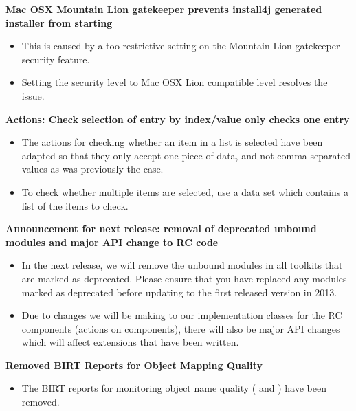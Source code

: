 
\textbf{Mac OSX Mountain Lion gatekeeper prevents install4j generated installer from starting}
\begin{itemize}
\item This is caused by a too-restrictive setting on the Mountain Lion gatekeeper security feature.
\item Setting the security level to Mac OSX Lion compatible level resolves the issue.
\end{itemize}

\textbf{Actions: Check selection of entry by index/value only checks one entry}
\begin{itemize}
\item The actions for checking whether an item in a list is selected have been adapted so that they only accept one piece of data, and not comma-separated values as was previously the case.
\item To check whether multiple items are selected, use a data set which contains a list of the items to check. 
\end{itemize}

\textbf{Announcement for next release: removal of deprecated unbound modules and major API change to RC code}
\begin{itemize}
\item In the next release, we will remove the unbound modules in all toolkits that are marked as deprecated. Please ensure that you have replaced any modules marked as deprecated before updating to the first released version in 2013.
\item Due to changes we will be making to our implementation classes for the RC components (actions on components), there will also be major API changes which will affect extensions that have been written. 
\end{itemize}

\textbf{Removed BIRT Reports for Object Mapping Quality}
\begin{itemize}
\item The BIRT reports for monitoring object name quality ( and ) have been removed.
\end{itemize}
